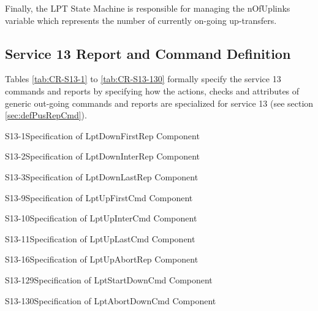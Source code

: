 \documentclass{pnp_article}
\begin{document}
Finally, the LPT State Machine is responsible for managing the nOfUplinks variable which represents the number of currently on-going up-transfers.


\subsection{Service 13 Report and Command Definition}\label{sec:serv13RepCmdDef}
Tables \ref{tab:CR-S13-1} to \ref{tab:CR-S13-130} formally specify the service 13 commands and reports by specifying how the actions, checks and attributes of generic out-going commands and reports are specialized for service 13 (see section \ref{sec:defPusRepCmd}). 


\begin{cr_rep}{S13-1}{Specification of LptDownFirstRep Component}
\end{cr_rep}

\newpage
\begin{cr_rep}{S13-2}{Specification of LptDownInterRep Component}
\end{cr_rep}

\begin{cr_rep}{S13-3}{Specification of LptDownLastRep Component}
\end{cr_rep}

\newpage
\begin{cr_cmd}{S13-9}{Specification of LptUpFirstCmd Component}
\end{cr_cmd}

\begin{cr_cmd}{S13-10}{Specification of LptUpInterCmd Component}
\end{cr_cmd}

\newpage
\begin{cr_cmd}{S13-11}{Specification of LptUpLastCmd Component}
\end{cr_cmd}

\begin{cr_rep}{S13-16}{Specification of LptUpAbortRep Component}
\end{cr_rep}

\newpage
\begin{cr_cmd}{S13-129}{Specification of LptStartDownCmd Component}
\end{cr_cmd}

\begin{cr_cmd}{S13-130}{Specification of LptAbortDownCmd Component}
\end{cr_cmd}
\end{document}
